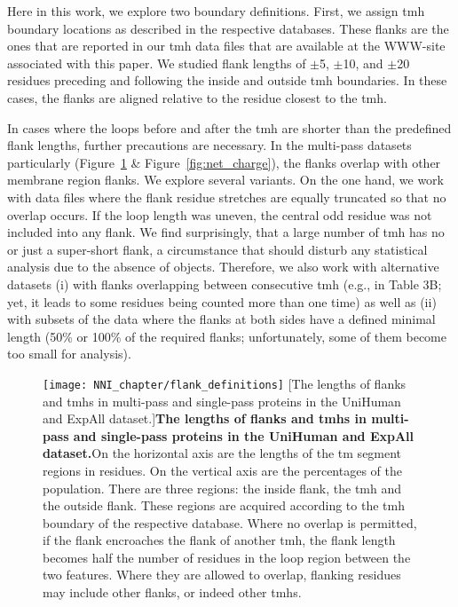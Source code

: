 Here in this work, we explore two boundary definitions. First, we assign \gls{tmh} boundary locations as described in the respective databases. These flanks are the ones that are reported in our \gls{tmh} data files that are available at the WWW-site associated with this paper. We studied flank lengths of $\pm$5, $\pm$10, and $\pm$20 residues preceding and following the inside and outside \gls{tmh} boundaries. In these cases, the flanks are aligned relative to the residue closest to the \gls{tmh}.

In cases where the loops before and after the \gls{tmh} are shorter than the predefined flank lengths, further precautions are necessary. In the multi-pass datasets particularly (Figure~\ref{fig:flank_definitions} \& Figure~\ref{fig:net_charge}), the flanks overlap with other membrane region flanks. We explore several variants. On the one hand, we work with data files where the flank residue stretches are equally truncated so that no overlap occurs. If the loop length was uneven, the central odd residue was not included into any flank. We find surprisingly, that a large number of \gls{tmh} has no or just a super-short flank, a circumstance that should disturb any statistical analysis due to the absence of objects. Therefore, we also work with alternative datasets (i) with flanks overlapping between consecutive \gls{tmh} (e.g., in Table 3B; yet, it leads to some residues being counted more than one time) as well as (ii) with subsets of the data where the flanks at both sides have a defined minimal length (50\% or 100\% of the required flanks; unfortunately, some of them become too small for analysis).

\begin{figure}[!ht]
\centering
\texttt{[image: NNI\_chapter/flank\_definitions]}
[The lengths of flanks and \gls{tmh}s in multi-pass and single-pass proteins in the UniHuman and ExpAll dataset.]{\textbf{The lengths of flanks and \gls{tmh}s in multi-pass and single-pass proteins in the UniHuman and ExpAll dataset.}On the horizontal axis are the lengths of the \gls{tm} segment regions in residues. On the vertical axis are the percentages of the population. There are three regions: the inside flank, the \gls{tmh} and the outside flank. These regions are acquired according to the \gls{tmh} boundary of the respective database. Where no overlap is permitted, if the flank encroaches the flank of another \gls{tmh}, the flank length becomes half the number of residues in the loop region between the two features. Where they are allowed to overlap, flanking residues may include other flanks, or indeed other \gls{tmh}s.}

\label{fig:flank_definitions}
\end{figure}

